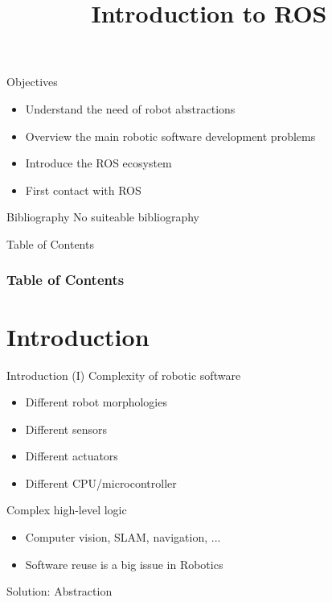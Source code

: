 \documentclass[10pt,compress]{beamer} %
\title[Introduction to ROS]{Introduction to ROS}
\author{}
\institute{\asignatura}
\date{}
\begin{document}
{\titlepageBlue
    \begin{frame}
        \titlepage
    \end{frame}
}

\begin{frame}[plain]{}
   \begin{block}{Objectives}
       \begin{itemize}
        \item Understand the need of robot abstractions
        \item Overview the main robotic software development problems
        \item Introduce the ROS ecosystem
        \item First contact with ROS
       \end{itemize}
   \end{block}

   \begin{block}{Bibliography}
       No suiteable bibliography
   \end{block}
\end{frame}

{
\begin{frame}[shrink]{Table of Contents}
 \frametitle{Table of Contents}
 \tableofcontents
\end{frame}
}

\section{Introduction}

\begin{frame}{Introduction (I)}
	Complexity of robotic software
	\begin{itemize}
		\item Different robot morphologies
		\item Different sensors
		\item Different actuators
		\item Different CPU/microcontroller
  	\end{itemize}
	Complex high-level logic
	\begin{itemize}
		\item Computer vision, SLAM, navigation, ...
		\item Software reuse is a big issue in Robotics
	\end{itemize}
	Solution: Abstraction
\end{frame}
\end{document}
